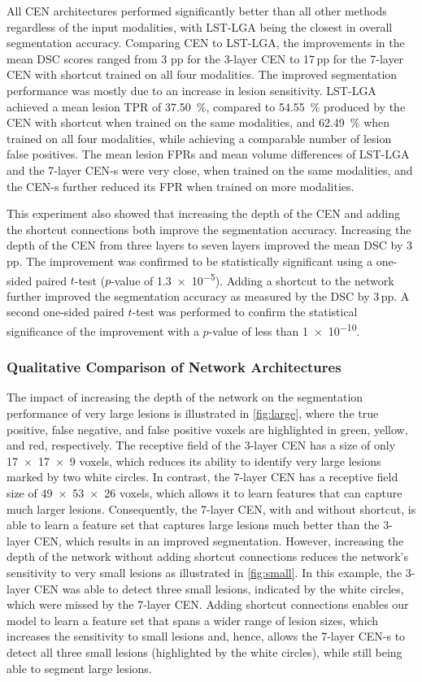 All CEN architectures performed significantly better than all other methods
regardless of the input modalities, with LST-LGA being the closest in overall
segmentation accuracy. Comparing CEN to LST-LGA, the improvements in the mean
DSC scores ranged from 3 \gls{pp} for the 3-layer CEN to 17\,pp
for the 7-layer CEN with shortcut trained on all four modalities. The improved
segmentation performance was mostly due to an increase in lesion sensitivity.
LST-LGA achieved a mean lesion TPR of \SI{37.50}{\percent}, compared to
\SI{54.55}{\percent} produced by the CEN with shortcut when trained on the same
modalities, and \SI{62.49}{\percent} when trained on all four modalities, while
achieving a comparable number of lesion false positives. The mean lesion FPRs
and mean volume differences of LST-LGA and the 7-layer CEN-s were very close,
when trained on the same modalities, and the CEN-s further reduced its FPR when
trained on more modalities.

This experiment also showed that increasing the depth of the CEN and adding the
shortcut connections both improve the segmentation accuracy. Increasing the
depth of the CEN from three layers to seven layers improved the mean DSC by
3\,pp. The improvement was confirmed to be statistically significant using a
one-sided paired $t$-test ($p$-value of \num{1.3e-5}). Adding a shortcut to the
network further improved the segmentation accuracy as measured by the DSC by
3\,pp. A second one-sided paired $t$-test was performed to confirm the
statistical significance of the improvement with a $p$-value of less than
\num{1e-10}.

\subsubsection{Qualitative Comparison of Network Architectures}

The impact of increasing the depth of the network on the segmentation
performance of very large lesions is illustrated in \ref{fig:large}, where the
true positive, false negative, and false positive voxels are highlighted in
green, yellow, and red, respectively. The receptive field of the 3-layer CEN has
a size of only \num{17x17x9} voxels, which reduces its ability to identify very
large lesions marked by two white circles. In contrast, the 7-layer CEN has a
receptive field size of \num{49x53x26} voxels, which allows it to learn features
that can capture much larger lesions. Consequently, the 7-layer CEN, with and
without shortcut, is able to learn a feature set that captures large lesions
much better than the 3-layer CEN, which results in an improved segmentation.
However, increasing the depth of the network without adding shortcut connections
reduces the network's sensitivity to very small lesions as illustrated in
\ref{fig:small}. In this example, the 3-layer CEN was able to detect three small
lesions, indicated by the white circles, which were missed by the 7-layer CEN.
Adding shortcut connections enables our model to learn a feature set that spans
a wider range of lesion sizes, which increases the sensitivity to small lesions
and, hence, allows the 7-layer \mbox{CEN-s} to detect all three small lesions
(highlighted by the white circles), while still being able to segment large
lesions.


